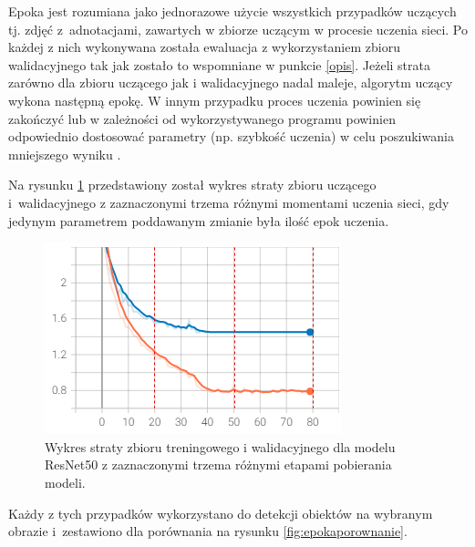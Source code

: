 \hspace{0.5cm}
Epoka jest rozumiana jako jednorazowe użycie wszystkich przypadków uczących tj. zdjęć z~adnotacjami, zawartych w zbiorze uczącym w procesie uczenia sieci. Po każdej z nich wykonywana została ewaluacja z wykorzystaniem zbioru walidacyjnego tak jak zostało to wspomniane w punkcie \ref{opis}. Jeżeli strata zarówno dla zbioru uczącego jak i walidacyjnego nadal maleje, algorytm uczący wykona następną epokę. W innym przypadku proces uczenia powinien się zakończyć lub w zależności od wykorzystywanego programu powinien odpowiednio dostosować parametry (np. szybkość uczenia) w celu poszukiwania mniejszego wyniku \cite{Leksykon}.


\hspace{0.5cm}
Na rysunku \ref{fig:epoka} przedstawiony został wykres straty zbioru uczącego i~walidacyjnego z zaznaczonymi trzema różnymi momentami uczenia sieci, gdy jedynym parametrem poddawanym zmianie była ilość epok uczenia.

\begin{figure}[H]
    \centering
    \includegraphics[width=0.5\linewidth]{Obrazy/Rozdzial05/epoka/zamieniony.png}
    \caption{Wykres straty zbioru treningowego i walidacyjnego dla modelu ResNet50 z zaznaczonymi trzema różnymi etapami pobierania modeli.}
    \label{fig:epoka}
\end{figure}

\hspace{0.5cm}
Każdy z tych przypadków wykorzystano do detekcji obiektów na wybranym obrazie i~zestawiono dla porównania na rysunku \ref{fig:epokaporownanie}.

